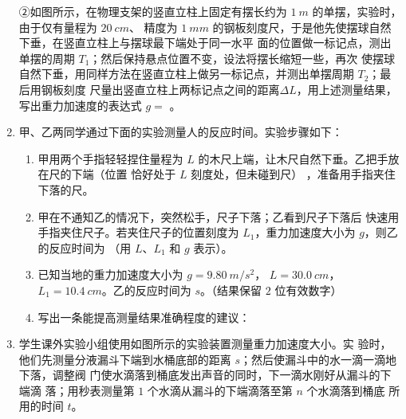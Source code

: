 \begin{enumerate}
②如图所示，在物理支架的竖直立柱上固定有摆长约为 $ 1 \ m $ 的单摆，实验时，由于仅有量程为 $ 20 \ cm $、
精度为 $ 1 \ mm $ 的钢板刻度尺，于是他先使摆球自然下垂，在竖直立柱上与摆球最下端处于同一水平
面的位置做一标记点，测出单摆的周期 $ T_{1} $；然后保持悬点位置不变，设法将摆长缩短一些，再次
使摆球自然下垂，用同样方法在竖直立柱上做另一标记点，并测出单摆周期 $ T_{2} $；最后用钢板刻度
尺量出竖直立柱上两标记点之间的距离$ \Delta L $，用上述测量结果，写出重力加速度的表达式
$ g= $  。





\newpage
\item
{}
甲、乙两同学通过下面的实验测量人的反应时间。实验步骤如下：
\begin{figure}[h!]
\centering

\end{figure}

\begin{enumerate}
\renewcommand{\labelenumi}{\arabic{enumi}.}
\item
甲用两个手指轻轻捏住量程为 $ L $ 的木尺上端，让木尺自然下垂。乙把手放在尺的下端（位置
恰好处于 $ L $ 刻度处，但未碰到尺）
，准备用手指夹住下落的尺。


\item 
甲在不通知乙的情况下，突然松手，尺子下落；乙看到尺子下落后
快速用手指夹住尺子。若夹住尺子的位置刻度为 $ L_{1} $，重力加速度大小为
$ g $，则乙的反应时间为
（用 $ L $、$ L_{1} $ 和 $ g $ 表示）。

\item 
已知当地的重力加速度大小为 $ g=9.80 \ m/s^{2} $， $ L=30.0 \ cm $， $ L_{1} =10.4 \ cm $。乙的反应时间为  
$ s $。（结果保留 $ 2 $ 位有效数字）

\item 
写出一条能提高测量结果准确程度的建议：  


\end{enumerate}



\newpage
\item 
{}
学生课外实验小组使用如图所示的实验装置测量重力加速度大小。实
验时，他们先测量分液漏斗下端到水桶底部的距离 $ s $；然后使漏斗中的水一滴一滴地下落，调整阀
门使水滴落到桶底发出声音的同时，下一滴水刚好从漏斗的下端滴
落；用秒表测量第 $ 1 $ 个水滴从漏斗的下端滴落至第 $ n $ 个水滴落到桶底
所用的时间 $ t $。
\begin{figure}[h!]
\centering

\end{figure}


\end{enumerate}

